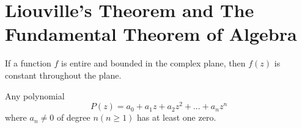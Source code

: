 \section{Liouville's Theorem and The Fundamental Theorem of Algebra}
\begin{theorem}
	If a function $ f $ is entire and bounded in the complex plane, then $ f(z) $ is constant throughout the plane. 
\end{theorem}
\begin{theorem}
	Any polynomial \[ P(z) = a_0 + a_1z + a_2z^2 + ... + a_n z^n \] where $ a_n \neq 0 $ of degree $ n(n \geq 1) $ has at least one zero.
\end{theorem}